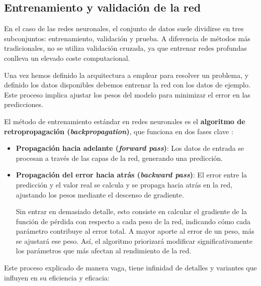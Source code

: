 \subsection{Entrenamiento y validación de la red}

En el caso de las redes neuronales, el conjunto de datos suele dividirse en tres 
subconjuntos: entrenamiento, validación y prueba. A diferencia de métodos más tradicionales, no se utiliza 
validación cruzada, ya que entrenar redes profundas conlleva un elevado coste computacional.

Una vez hemos definido la arquitectura a emplear para resolver un problema, y definido los datos disponibles 
debemos entrenar la red con los datos de ejemplo. Este proceso implica ajustar los pesos del modelo para 
minimizar el error en las predicciones. 

El método de entrenamiento estándar en redes neuronales es el \textbf{algoritmo de retropropagación 
(\textit{backpropagation})}, que funciona en dos fases clave \cite{szeliski2010}:

\begin{itemize}

    \item \textbf{Propagación hacia adelante (\textit{forward pass})}: Los datos de entrada se procesan a 
    través de las capas de la red, generando una predicción. 

    \item \textbf{Propagación del error hacia atrás (\textit{backward pass})}: El error entre la 
    predicción y el valor real se calcula y se propaga hacia atrás en la red, ajustando los pesos mediante el 
    descenso de gradiente.
    
    Sin entrar en demasiado detalle, esto consiste en calcular el gradiente de la función de pérdida con           %
    respecto a cada peso de la red, indicando cómo cada parámetro contribuye al error total. 
    A mayor aporte al error de un peso, más se ajustará ese peso. Así, el algoritmo priorizará modificar 
    significativamente los parámetros que más afectan al rendimiento de la red.
    
\end{itemize}

Este proceso explicado de manera vaga, tiene infinidad de detalles y variantes que influyen en su eficiencia y
eficacia:

